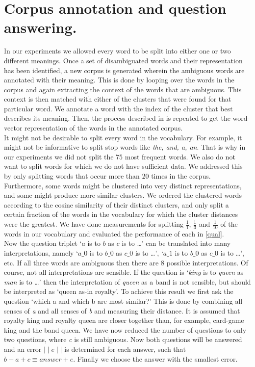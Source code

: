 \documentclass[11pt]{article}
\begin{document}
\section{Corpus annotation and question answering.}
In our experiments we allowed every word to be split into either one or two different meanings.
Once a set of disambiguated words and their representation has been identified, a new corpus is generated wherein the ambiguous words are annotated with their meaning. This is done by looping over the words in the corpus and again extracting the context of the words that are ambiguous. This context is then matched with either of the clusters that were found for that particular word. We annotate a word with the index of the cluster that best describes its meaning. Then, the process described in \cite{Mikolov:13} is repeated to get the word-vector representation of the words in the annotated corpus. \\
It might not be desirable to split every word in the vocabulary. For example, it might not be informative to split stop words like \textit{the, and, a, an}. That is why in our experiments we did not split the 75 most frequent words. We also do not want to split words for which we do not have sufficient data. We addressed this by only splitting words that occur more than $20$ times in the corpus. Furthermore, some words might be clustered into very distinct representations, and some might produce more similar clusters. We ordered the clustered words according to the cosine similarity of their distinct clusters, and only split a certain fraction of the words in the vocabulary for which the cluster distances were the greatest. We have done measurements for splitting $\frac{1}{1}$, $\frac{1}{3}$ and $\frac{1}{10}$ of the words in our vocabulary and evaluated the performance of each in \ref{qual}.\\
Now the question triplet `$a$ is to $b$ as $c$ is to \dots' can be translated into many interpretations, namely `$a\_0$ is to $b\_0 $ as $c\_0 $ is to \dots', `$a\_1$ is to $b\_0 $ as $c\_0 $ is to \dots', etc. If all three words are ambiguous then there are 8 possible interpretations. Of course, not all interpretations are sensible. If the question is `\textit{king} is to \textit{queen} as \textit{man} is to \dots' then the interpretation of \textit{queen} as a band is not sensible, but should be interpreted as `queen as-in royalty'. To achieve this result we first ask the question `which a and which b are most similar?' This is done by combining all senses of \textit{a} and all senses of \textit{b} and measuring their distance. It is assumed that royalty king and royalty queen are closer together than, for example, card-game king and the band queen. We have now reduced the number of questions to only two questions, where \textit{c} is still ambiguous. Now both questions will be answered and an error $\mid\mid \textit{e} \mid\mid$ is determined for each answer, such that $\textit{b} - \textit{a} + \textit{c} \equiv \textit{answer} + \textit{e}$. Finally we choose the answer with the smallest error.
\end{document}
